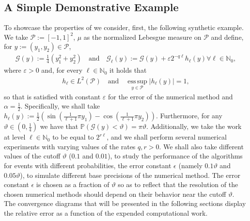 \documentclass{article}
\newcommand{\cG}{\mathcal{G}}
\newcommand{\cP}{\mathcal{P}}
\newcommand{\IN}{\mathbb{N}}
\newcommand{\IP}{\mathbb{P}}
\newcommand{\abs}[1]{{\left\vert #1 \right\vert}}
\newcommand{\lp}[2]{{L}^{#1}( #2 )}
\theoremstyle{definition}
\DeclareMathOperator*{\esssup}{ess\,sup}
\begin{document}
\subsection{A Simple Demonstrative Example}
To showcase the properties of  we consider, first, the following synthetic example.
We take $\cP:=[-1,1]^2$, $\mu$ as the normalized Lebesgue measure on $\cP$ and define, for $y:=(y_1,y_2)\in\cP$,
\begin{align*}
  \cG(y):=\frac{1}{4}(y_1^2+y_2^2)
  \quad\text{and}\quad
  \cG_\ell(y):=\cG(y)+\varepsilon 2^{-q\ell}h_\ell(y) \forall\ell\in\IN_0,
\end{align*}
where $\varepsilon>0$ and, for every $\ell\in\IN_0$ it holds that
\begin{align*}
  h_\ell\in\lp{2}{\cP}
  \quad\text{and}\quad
  \esssup\limits_{y\in\cP}\abs{h_\ell(y)}=1,
\end{align*}
so that  is satisfied with constant $\varepsilon$ for the error of the numerical method and
$\alpha=\frac{1}{2}$. Specifically, we shall take $h_\ell(y):=\tfrac{1}{2}(\sin(\tfrac{1}{\ell+1}\pi y_1)-\cos(\tfrac{1}{\ell+1}\pi y_2))$.
Furthermore, for any $\vartheta\in(0,\frac{1}{4})$ we have that
$\IP(\cG(y)<\vartheta)=\pi\vartheta$. Additionally, we take the work at level $\ell\in\IN_0$ to be equal
to $2^{r\ell}$, and we shall perform several numerical experiments with varying values of the rates $q,r>0$. We shall also take different
values of the cutoff $\vartheta$ ($0.1$ and $0.01$), to study the performance of the algorithms for events with different probabilities,
the error constant $\epsilon$ (namely $0.1\vartheta$ and $0.05\vartheta$), to simulate different base precisions of the numerical method.
The error constant $\epsilon$ is chosen as a fraction of $\vartheta$ so as to reflect that the resolution of the chosen numerical methods 
should depend on their behavior near the cutoff $\vartheta$. The convergence diagrams that will
be presented in the following sections display the relative error as a function of the expended computational work.

      
\end{document}

